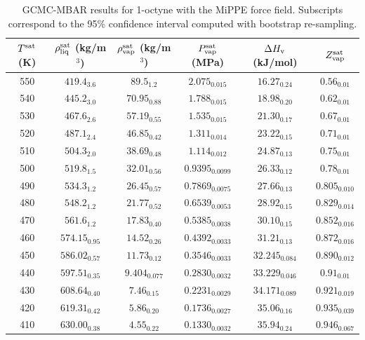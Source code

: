 \documentclass[journal=jctc,manuscript=article]{achemso}
\begin{document}
\begin{table}[htb!]
	\caption{GCMC-MBAR results for 1-octyne with the MiPPE force field. Subscripts correspond to the 95\% confidence interval computed with bootstrap re-sampling.}
	\begin{center}
		\begin{tabular}{|c|c|c|c|c|c|}
			\hline
			$T^{\rm sat}$ (K) & $\rho_{\rm liq}^{\rm sat}$ (kg/m$^3$) & $\rho_{\rm vap}^{\rm sat}$ (kg/m$^3$) & $P_{\rm vap}^{\rm sat}$ (MPa) & $\Delta H_{\rm v}$ (kJ/mol) & $Z_{\rm vap}^{\rm sat}$ \\ \hline
			550 & $419.4_{3.6}$ & $89.5_{1.2}$ & $2.075_{0.015}$ & $16.27_{0.24}$ & $0.56_{0.01}$ \\
			540 & $445.2_{3.0}$ & $70.95_{0.88}$ & $1.788_{0.015}$ & $18.98_{0.20}$ & $0.62_{0.01}$ \\
			530 & $467.6_{2.6}$ & $57.19_{0.55}$ & $1.535_{0.015}$ & $21.30_{0.17}$ & $0.67_{0.01}$ \\
			520 & $487.1_{2.4}$ & $46.85_{0.42}$ & $1.311_{0.014}$ & $23.22_{0.15}$ & $0.71_{0.01}$ \\
			510 & $504.3_{2.0}$ & $38.69_{0.48}$ & $1.114_{0.012}$ & $24.87_{0.13}$ & $0.75_{0.01}$ \\
			500 & $519.8_{1.5}$ & $32.01_{0.56}$ & $0.9395_{0.0099}$ & $26.33_{0.12}$ & $0.78_{0.01}$ \\
			490 & $534.3_{1.2}$ & $26.45_{0.57}$ & $0.7869_{0.0075}$ & $27.66_{0.13}$ & $0.805_{0.010}$ \\
			480 & $548.2_{1.2}$ & $21.77_{0.52}$ & $0.6539_{0.0053}$ & $28.92_{0.15}$ & $0.829_{0.014}$ \\
			470 & $561.6_{1.2}$ & $17.83_{0.40}$ & $0.5385_{0.0038}$ & $30.10_{0.15}$ & $0.852_{0.016}$ \\
			460 & $574.15_{0.95}$ & $14.52_{0.26}$ & $0.4392_{0.0033}$ & $31.21_{0.13}$ & $0.872_{0.016}$ \\
			450 & $586.02_{0.57}$ & $11.73_{0.12}$ & $0.3546_{0.0033}$ & $32.245_{0.084}$ & $0.890_{0.012}$ \\
			440 & $597.51_{0.35}$ & $9.404_{0.077}$ & $0.2830_{0.0032}$ & $33.229_{0.046}$ & $0.91_{0.01}$ \\
			430 & $608.64_{0.40}$ & $7.46_{0.15}$ & $0.2231_{0.0029}$ & $34.171_{0.089}$ & $0.921_{0.019}$ \\
			420 & $619.31_{0.42}$ & $5.86_{0.20}$ & $0.1736_{0.0027}$ & $35.06_{0.16}$ & $0.935_{0.039}$ \\
			410 & $630.00_{0.38}$ & $4.55_{0.22}$ & $0.1330_{0.0032}$ & $35.94_{0.24}$ & $0.946_{0.067}$ \\
			\hline
		\end{tabular}
	\end{center}
\end{table}
\end{document}
